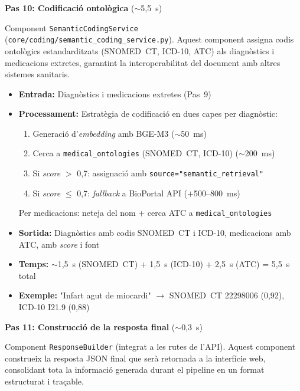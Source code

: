 \documentclass[CAT]{TFUOC}%
\begin{document}
\vspace{0.4em}

\textbf{Pas 10: Codificació ontològica} ($\sim$5,5~s)

Component \texttt{SemanticCodingService} (\texttt{core/coding/semantic\_coding\_service.py}). Aquest component assigna codis ontològics estandarditzats (SNOMED~CT, ICD-10, ATC) als diagnòstics i medicacions extretes, garantint la interoperabilitat del document amb altres sistemes sanitaris.

\begin{itemize}
    \setlength{\itemsep}{0.3em}
    \item \textbf{Entrada:} Diagnòstics i medicacions extretes (Pas~9)
    \item \textbf{Processament:} Estratègia de codificació en dues capes per diagnòstic:
    \begin{enumerate}
        \item Generació d'\textit{embedding} amb BGE-M3 ($\sim$50~ms)
        \item Cerca a \texttt{medical\_ontologies} (SNOMED~CT, ICD-10) ($\sim$200~ms)
        \item Si \textit{score} $>$ 0,7: assignació amb \texttt{source="semantic\_retrieval"}
        \item Si \textit{score} $\leq$ 0,7: \textit{fallback} a BioPortal API ($+$500--800~ms)
    \end{enumerate}
    Per medicacions: neteja del nom + cerca ATC a \texttt{medical\_ontologies}
    \item \textbf{Sortida:} Diagnòstics amb codis SNOMED~CT i ICD-10, medicacions amb ATC, amb \textit{score} i font
    \item \textbf{Temps:} $\sim$1,5~s (SNOMED~CT) + 1,5~s (ICD-10) + 2,5~s (ATC) = 5,5~s total
    \item \textbf{Exemple:} "Infart agut de miocardi" $\rightarrow$ SNOMED~CT 22298006 (0,92), ICD-10 I21.9 (0,88)
\end{itemize}

\vspace{0.4em}

\textbf{Pas 11: Construcció de la resposta final} ($\sim$0,3~s)

Component \texttt{ResponseBuilder} (integrat a les rutes de l'API). Aquest component construeix la resposta JSON final que serà retornada a la interfície web, consolidant tota la informació generada durant el pipeline en un format estructurat i traçable.
\end{document}
